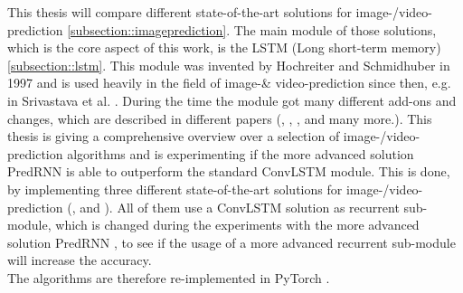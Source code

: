 This thesis will compare different state-of-the-art solutions for image-/video-prediction \ref{subsection::imageprediction}.
The main module of those solutions, which is the core aspect of this work, is the LSTM (Long short-term memory) \ref{subsection::lstm}.
This module was invented by Hochreiter and Schmidhuber  \cite{Hochreiter1997} in 1997 and is used heavily in the field of image-\& video-prediction since then, e.g. in Srivastava et al. 
\cite{Srivastava2015}.
During the time the module got many different add-ons and changes, which are described in different papers (\cite{Patraucean2015}, \cite{Lotter2016}, \cite{Wang2017}, \cite{Wang2018} and many more.). 
This thesis is giving a comprehensive overview over a selection of image-/video-prediction algorithms and is experimenting if the more advanced solution PredRNN \cite{Wang2017} is able to outperform the standard ConvLSTM module. This is done, by implementing
three different state-of-the-art solutions for image-/video-prediction (\cite{Shi2015}, \cite{Patraucean2015} and \cite{Lotter2016}).
All of them use a ConvLSTM solution as recurrent sub-module, which is changed during the experiments
with the more advanced solution PredRNN \cite{Wang2017}, to see if the usage of a more advanced recurrent sub-module will increase the accuracy.\\
The algorithms are therefore re-implemented in PyTorch \cite{Paszke2019}.